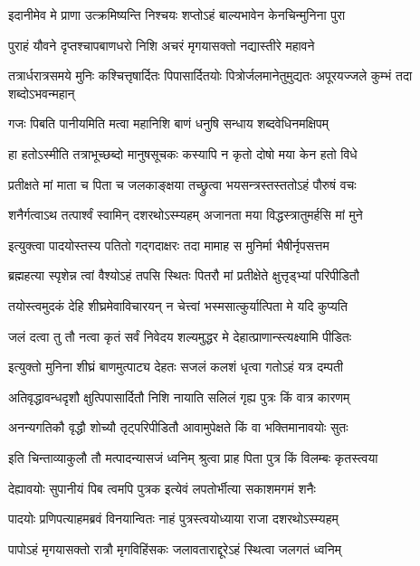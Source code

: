 \twolineshloka
{इदानीमेव मे प्राणा उत्क्रमिष्यन्ति निश्चयः}
{शप्तोऽहं बाल्यभावेन केनचिन्मुनिना पुरा} %

\twolineshloka
{पुराहं यौवने दृप्तश्चापबाणधरो निशि}
{अचरं मृगयासक्तो नद्यास्तीरे महावने} %

\threelineshloka
{तत्रार्धरात्रसमये मुनिः कश्चित्तृषार्दितः}
{पिपासार्दितयोः पित्रोर्जलमानेतुमुद्यतः}
{अपूरयज्जले कुम्भं तदा शब्दोऽभवन्महान्} %

\twolineshloka
{गजः पिबति पानीयमिति मत्वा महानिशि}
{बाणं धनुषि सन्धाय शब्दवेधिनमक्षिपम्} %

\twolineshloka
{हा हतोऽस्मीति तत्राभूच्छब्दो मानुषसूचकः}
{कस्यापि न कृतो दोषो मया केन हतो विधे} %

\twolineshloka
{प्रतीक्षते मां माता च पिता च जलकाङ्क्षया}
{तच्छ्रुत्वा भयसन्त्रस्तस्ततोऽहं पौरुषं वचः} %

\twolineshloka
{शनैर्गत्वाऽथ तत्पार्श्वं स्वामिन् दशरथोऽस्म्यहम्}
{अजानता मया विद्धस्त्रातुमर्हसि मां मुने} %

\twolineshloka
{इत्युक्त्वा पादयोस्तस्य पतितो गद्गदाक्षरः}
{तदा मामाह स मुनिर्मा भैषीर्नृपसत्तम} %

\twolineshloka
{ब्रह्महत्या स्पृशेन्न त्वां वैश्योऽहं तपसि स्थितः}
{पितरौ मां प्रतीक्षेते क्षुत्तृड्भ्यां परिपीडितौ} %

\twolineshloka
{तयोस्त्वमुदकं देहि शीघ्रमेवाविचारयन्}
{न चेत्त्वां भस्मसात्कुर्यात्पिता मे यदि कुप्यति} %

\twolineshloka
{जलं दत्वा तु तौ नत्वा कृतं सर्वं निवेदय}
{शल्यमुद्धर मे देहात्प्राणान्स्त्यक्ष्यामि पीडितः} %

\twolineshloka
{इत्युक्तो मुनिना शीघ्रं बाणमुत्पाट्य देहतः}
{सजलं कलशं धृत्वा गतोऽहं यत्र दम्पती} %

\twolineshloka
{अतिवृद्धावन्धदृशौ क्षुत्पिपासार्दितौ निशि}
{नायाति सलिलं गृह्य पुत्रः किं वात्र कारणम्} %

\twolineshloka
{अनन्यगतिकौ वृद्धौ शोच्यौ तृट्परिपीडितौ}
{आवामुपेक्षते किं वा भक्तिमानावयोः सुतः} %

\twolineshloka
{इति चिन्ताव्याकुलौ तौ मत्पादन्यासजं ध्वनिम्}
{श्रुत्वा प्राह पिता पुत्र किं विलम्बः कृतस्त्वया} %

\twolineshloka
{देह्यावयोः सुपानीयं पिब त्वमपि पुत्रक}
{इत्येवं लपतोर्भीत्या सकाशमगमं शनैः} %

\twolineshloka
{पादयोः प्रणिपत्याहमब्रवं विनयान्वितः}
{नाहं पुत्रस्त्वयोध्याया राजा दशरथोऽस्म्यहम्} %

\twolineshloka
{पापोऽहं मृगयासक्तो रात्रौ मृगविहिंसकः}
{जलावताराद्दूरेऽहं स्थित्वा जलगतं ध्वनिम्} %

